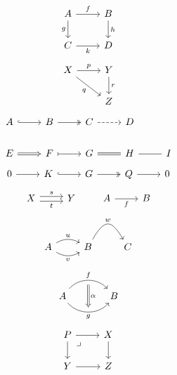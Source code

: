 \documentclass{amsart}
\begin{document}
\[\begin{tikzcd}
  A \arrow[r, "f"] \arrow[d, "g"'] & B \arrow[d, "h"] \\
  C \arrow[r, "k"'] & D
\end{tikzcd}\]
\[\begin{tikzcd}
  X \ar[r, "p"] \ar[rd, "q"'] & Y \ar[d, "r"] \\
  & Z
\end{tikzcd}\]
\[\begin{tikzcd}
  A \ar[r, hookrightarrow] & B \ar[r, twoheadrightarrow] & C \ar[r, dashrightarrow] & D \\
  E \ar[r, Rightarrow] & F \ar[r, mapsto] & G \ar[r, equals] & H \ar[r, dash] & I
\end{tikzcd}\]
\[\begin{tikzcd}
  0 \ar[r] & K \ar[r, hook] & G \ar[r, two heads] & Q \ar[r] & 0
\end{tikzcd}\]
\[\begin{tikzcd}
  X \ar[r, shift left, "s"] \ar[r, shift right, "t"'] & Y
\end{tikzcd}
\qquad
\begin{tikzcd}
  A \ar[r, "f", swap] & B
\end{tikzcd}\]
\[\begin{tikzcd}
  A \ar[r, bend left, "u"] \ar[r, bend right, "v"'] & B \ar[r, out=60, in=120, looseness=2, "w"] & C
\end{tikzcd}\]
\[\begin{tikzcd}[column sep=large]
  A \ar[r, bend left=50, ""{name=U, below}, "f"] \ar[r, bend right=50, ""{name=D}, "g"'] & B
  \ar[Rightarrow, from=U, to=D, "\alpha"]
\end{tikzcd}\]
\[\begin{tikzcd}
  P \ar[r] \ar[d] \ar[dr, phantom, "\lrcorner", very near start] & X \ar[d] \\
  Y \ar[r] & Z
\end{tikzcd}\]
\end{document}
